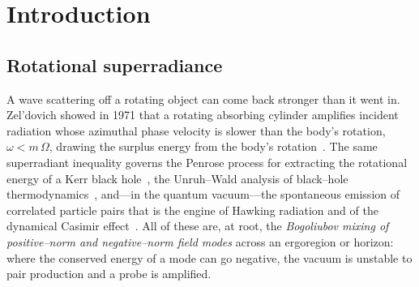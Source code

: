 \documentclass[11pt]{article}
\begin{document}
\tableofcontents

\section{Introduction}

\subsection{Rotational superradiance}
A wave scattering off a rotating object can come back stronger than it went in. Zel'dovich
showed in 1971 that a rotating absorbing cylinder amplifies incident radiation whose azimuthal
phase velocity is slower than the body's rotation, $\omega<m\,\Omega$, drawing the surplus energy
from the body's rotation~\cite{zeldovich1971,zeldovich1972}. The same superradiant inequality
governs the Penrose process for extracting the rotational energy of a Kerr black
hole~\cite{penrose1969}, the Unruh--Wald analysis of black--hole
thermodynamics~\cite{unruh1976}, and---in the quantum vacuum---the spontaneous emission of
correlated particle pairs that is the engine of Hawking radiation and of the dynamical Casimir
effect~\cite{brito2015}. All of these are, at root, the \emph{Bogoliubov mixing of
positive--norm and negative--norm field modes} across an ergoregion or horizon: where the
conserved energy of a mode can go negative, the vacuum is unstable to pair production and a
probe is amplified.
\end{document}
